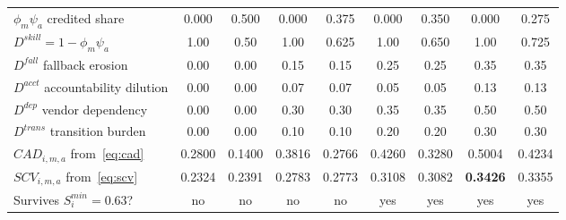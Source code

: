 \documentclass[utf8]{FrontiersinHarvard}
\begin{document}
\begin{table}[!htbp]
\begin{tabularx}{\textwidth}{@{}Xcccccccc@{}}
			$\phi_m\psi_a$ credited share & 0.000 & 0.500 & 0.000 & 0.375 & 0.000 & 0.350 & 0.000 & 0.275\\
			$D^{skill}=1-\phi_m\psi_a$ & 1.00 & 0.50 & 1.00 & 0.625 & 1.00 & 0.650 & 1.00 & 0.725\\
			$D^{fall}$ fallback erosion & 0.00 & 0.00 & 0.15 & 0.15 & 0.25 & 0.25 & 0.35 & 0.35\\
			$D^{acct}$ accountability dilution & 0.00 & 0.00 & 0.07 & 0.07 & 0.05 & 0.05 & 0.13 & 0.13\\
			$D^{dep}$ vendor dependency & 0.00 & 0.00 & 0.30 & 0.30 & 0.35 & 0.35 & 0.50 & 0.50\\
			$D^{trans}$ transition burden & 0.00 & 0.00 & 0.10 & 0.10 & 0.20 & 0.20 & 0.30 & 0.30\\
			\midrule
			$CAD_{i,m,a}$ from~\eqref{eq:cad} & 0.2800 & 0.1400 & 0.3816 & 0.2766 & 0.4260 & 0.3280 & 0.5004 & 0.4234\\
			$SCV_{i,m,a}$ from~\eqref{eq:scv} & 0.2324 & 0.2391 & 0.2783 & 0.2773 & 0.3108 & 0.3082 & \textbf{0.3426} & 0.3355\\
			\midrule
			Survives $S^{min}_i=0.63$? & no & no & no & no & yes & yes & yes & yes\\
			\bottomrule
		\end{tabularx}
	\end{table}
\end{document}
